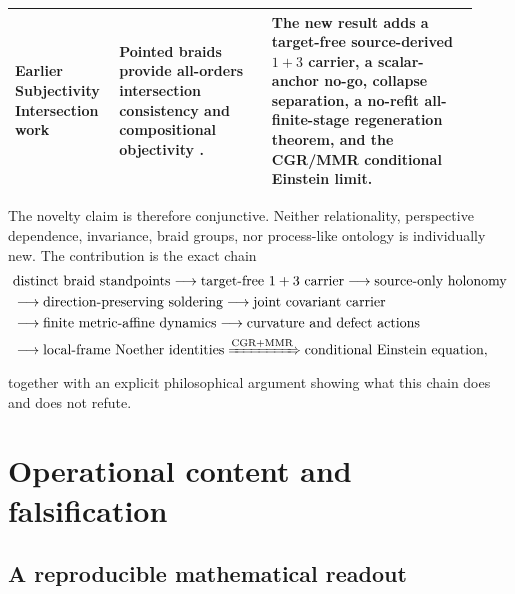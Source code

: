 \documentclass[11pt]{article}
\theoremstyle{definition}
\theoremstyle{remark}
\begin{document}
{\begin{longtable}{>{\raggedright\arraybackslash}p{0.19\linewidth}>{\raggedright\arraybackslash}p{0.31\linewidth}>{\raggedright\arraybackslash}p{0.42\linewidth}}
Earlier Subjectivity Intersection work & Pointed braids provide all-orders intersection consistency and compositional objectivity \cite{watanabe2026braid}. & The new result adds a target-free source-derived $1+3$ carrier, a scalar-anchor no-go, collapse separation, a no-refit all-finite-stage regeneration theorem, and the CGR/MMR conditional Einstein limit. \\
\bottomrule
\end{longtable}
}

The novelty claim is therefore conjunctive. Neither relationality, perspective dependence, invariance, braid groups, nor process-like ontology is individually new. The contribution is the exact chain
\begin{equation}\label{eq:novelchain}
\begin{aligned}
&\text{distinct braid standpoints}
\longrightarrow\text{target-free $1+3$ carrier}
\longrightarrow\text{source-only holonomy}\\
&\longrightarrow\text{direction-preserving soldering}
\longrightarrow\text{joint covariant carrier}\\
&\longrightarrow\text{finite metric-affine dynamics}
\longrightarrow\text{curvature and defect actions}\\
&\longrightarrow\text{local-frame Noether identities}
\xRightarrow{\mathrm{CGR+MMR}}\text{conditional Einstein equation},
\end{aligned}
\end{equation}
together with an explicit philosophical argument showing what this chain does and does not refute.

\section{Operational content and falsification}

\subsection{A reproducible mathematical readout}
\end{document}
